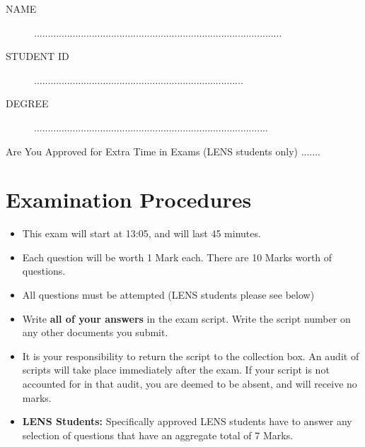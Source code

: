 \documentclass[11pt]{article} %
\begin{document}
	
	
	
	
	\Large
\newpage

\begin{framed}
\begin{description}
\item[NAME]  ..........................................................................................
\bigskip
\item[STUDENT ID] ............................................................................
\bigskip
\item[DEGREE] .....................................................................................
\end{description}
\end{framed}
\noindent Are You Approved for Extra Time in Exams (LENS students only)  .......
\section*{Examination Procedures}
\begin{itemize} 
	\item This exam will start at 13:05, and will last 45 minutes.
		\item Each question will be worth 1 Mark each. There are 10 Marks worth of questions.
	\item All questions must be attempted (LENS students please see below)
		\item Write \textbf{all of your answers} in the exam script. Write the script number on any other documents you submit.
		\item It is your responsibility to return the script to the collection box. 
		An audit of scripts will take place immediately after the exam. If your script is not accounted for in that audit,  you are deemed to be absent, and will receive no marks.
	
	\item \textbf{LENS Students: }
	Specifically approved LENS students have to answer any selection of questions that have an aggregate total of 7 Marks.  

	
	
\end{itemize}
\end{document}
